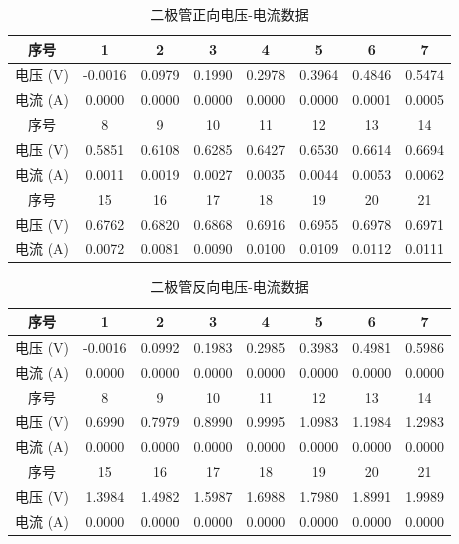 \documentclass[zihao=5, UTF8]{article}
\theoremstyle{MyLineTheoremStyle} %
\theoremstyle{MyBlockTheoremStyle} %
\theoremstyle{MySubsubsectionStyle} %
\begin{document}
\begin{table}[H]
\centering
\begin{tabular}{|c|c|c|c|c|c|c|c|} 
\hline
序号 & 1       & 2      & 3      & 4      & 5      & 6      & 7       \\ 
\hline
电压 (\unit{V})& -0.0016 & 0.0979 & 0.1990 & 0.2978 & 0.3964 & 0.4846 & 0.5474  \\ 
\hline
电流 (\unit{A})& 0.0000  & 0.0000 & 0.0000 & 0.0000 & 0.0000 & 0.0001 & 0.0005  \\ 
\hline
序号 & 8       & 9      & 10     & 11     & 12     & 13     & 14      \\ 
\hline
电压 (\unit{V})& 0.5851  & 0.6108 & 0.6285 & 0.6427 & 0.6530 & 0.6614 & 0.6694  \\ 
\hline
电流 (\unit{A})& 0.0011  & 0.0019 & 0.0027 & 0.0035 & 0.0044 & 0.0053 & 0.0062  \\ 
\hline
序号 & 15      & 16     & 17     & 18     & 19     & 20     & 21      \\ 
\hline
电压 (\unit{V})& 0.6762  & 0.6820 & 0.6868 & 0.6916 & 0.6955 & 0.6978 & 0.6971  \\ 
\hline
电流 (\unit{A})& 0.0072  & 0.0081 & 0.0090 & 0.0100 & 0.0109 & 0.0112 & 0.0111  \\
\hline
\end{tabular}
\caption{二极管正向电压-电流数据}
\label{tab:exp4_data_diode_postive}
\end{table}

\begin{table}[H]
\centering
\begin{tabular}{|c|c|c|c|c|c|c|c|} 
\hline
序号 & 1       & 2      & 3      & 4      & 5      & 6      & 7       \\ 
\hline
电压 (\unit{V})& -0.0016 & 0.0992 & 0.1983 & 0.2985 & 0.3983 & 0.4981 & 0.5986  \\ 
\hline
电流 (\unit{A})& 0.0000  & 0.0000 & 0.0000 & 0.0000 & 0.0000 & 0.0000 & 0.0000  \\ 
\hline
序号 & 8       & 9      & 10     & 11     & 12     & 13     & 14      \\ 
\hline
电压 (\unit{V})& 0.6990  & 0.7979 & 0.8990 & 0.9995 & 1.0983 & 1.1984 & 1.2983  \\ 
\hline
电流 (\unit{A})& 0.0000  & 0.0000 & 0.0000 & 0.0000 & 0.0000 & 0.0000 & 0.0000  \\ 
\hline
序号 & 15      & 16     & 17     & 18     & 19     & 20     & 21      \\ 
\hline
电压 (\unit{V})& 1.3984  & 1.4982 & 1.5987 & 1.6988 & 1.7980 & 1.8991 & 1.9989  \\ 
\hline
电流 (\unit{A})& 0.0000  & 0.0000 & 0.0000 & 0.0000 & 0.0000 & 0.0000 & 0.0000  \\
\hline
\end{tabular}
\caption{二极管反向电压-电流数据}
\label{tab:exp4_data_diode_negative}
\end{table}
\end{document}
